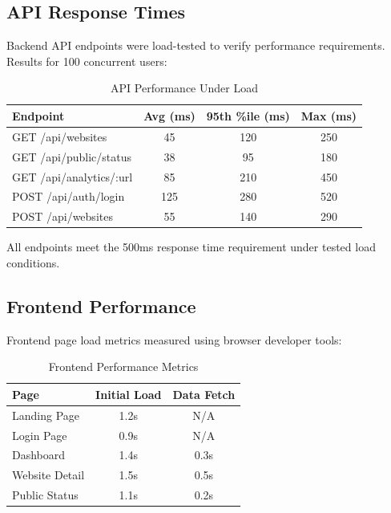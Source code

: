 \subsection{API Response Times}

Backend API endpoints were load-tested to verify performance requirements. Results for 100 concurrent users:

\begin{table}[htbp]
    \centering
    \caption{API Performance Under Load}
    \label{tab:api-performance}
    \begin{tabular}{lccc}
        \toprule
        \textbf{Endpoint} & \textbf{Avg (ms)} & \textbf{95th \%ile (ms)} & \textbf{Max (ms)} \\
        \midrule
        GET /api/websites & 45 & 120 & 250 \\
        GET /api/public/status & 38 & 95 & 180 \\
        GET /api/analytics/:url & 85 & 210 & 450 \\
        POST /api/auth/login & 125 & 280 & 520 \\
        POST /api/websites & 55 & 140 & 290 \\
        \bottomrule
    \end{tabular}
\end{table}

All endpoints meet the 500ms response time requirement under tested load conditions.

\subsection{Frontend Performance}

Frontend page load metrics measured using browser developer tools:

\begin{table}[htbp]
    \centering
    \caption{Frontend Performance Metrics}
    \label{tab:frontend-performance}
    \begin{tabular}{lcc}
        \toprule
        \textbf{Page} & \textbf{Initial Load} & \textbf{Data Fetch} \\
        \midrule
        Landing Page & 1.2s & N/A \\
        Login Page & 0.9s & N/A \\
        Dashboard & 1.4s & 0.3s \\
        Website Detail & 1.5s & 0.5s \\
        Public Status & 1.1s & 0.2s \\
        \bottomrule
    \end{tabular}
\end{table}

